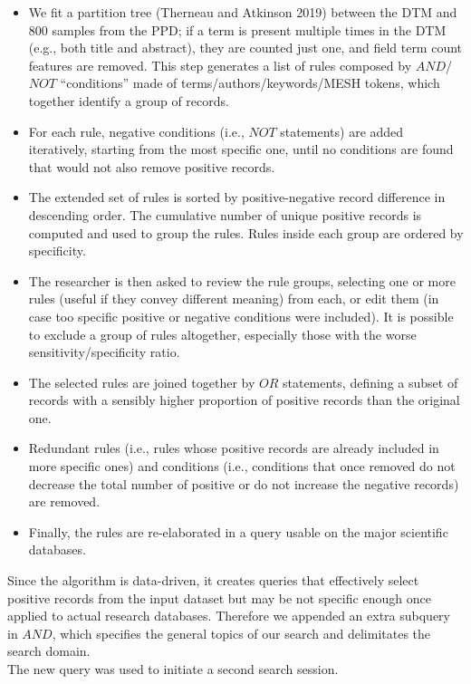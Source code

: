 \documentclass{article}
\begin{document}
\begin{itemize}
\tightlist
\item
  We fit a partition tree (Therneau and Atkinson 2019) between the DTM
  and 800 samples from the PPD; if a term is present multiple times in
  the DTM (e.g., both title and abstract), they are counted just one,
  and field term count features are removed. This step generates a list
  of rules composed by \(AND\)/\(NOT\) ``conditions'' made of
  terms/authors/keywords/MESH tokens, which together identify a group of
  records.
\item
  For each rule, negative conditions (i.e., \(NOT\) statements) are
  added iteratively, starting from the most specific one, until no
  conditions are found that would not also remove positive records.
\item
  The extended set of rules is sorted by positive-negative record
  difference in descending order. The cumulative number of unique
  positive records is computed and used to group the rules. Rules inside
  each group are ordered by specificity.
\item
  The researcher is then asked to review the rule groups, selecting one
  or more rules (useful if they convey different meaning) from each, or
  edit them (in case too specific positive or negative conditions were
  included). It is possible to exclude a group of rules altogether,
  especially those with the worse sensitivity/specificity ratio.
\item
  The selected rules are joined together by \(OR\) statements, defining
  a subset of records with a sensibly higher proportion of positive
  records than the original one.
\item
  Redundant rules (i.e., rules whose positive records are already
  included in more specific ones) and conditions (i.e., conditions that
  once removed do not decrease the total number of positive or do not
  increase the negative records) are removed.
\item
  Finally, the rules are re-elaborated in a query usable on the major
  scientific databases.
\end{itemize}

Since the algorithm is data-driven, it creates queries that effectively
select positive records from the input dataset but may be not specific
enough once applied to actual research databases. Therefore we appended
an extra subquery in \(AND\), which specifies the general topics of our
search and delimitates the search domain.\\
The new query was used to initiate a second search session.
\end{document}
